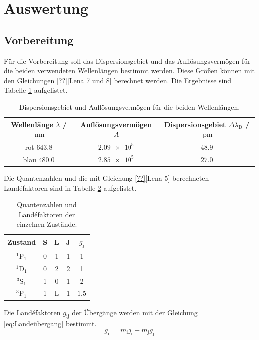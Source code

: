 \section{Auswertung}
\label{sec:Auswertung}
\subsection{Vorbereitung}
Für die Vorbereitung soll das Dispersionsgebiet und das Auflösungsvermögen für die beiden 
verwendeten Wellenlängen bestimmt werden. Diese Größen können mit den Gleichungen \eqref{??}[Lena 7 und 8] berechnet werden.
Die Ergebnisse sind Tabelle \ref{tab:Vorbereitung} aufgelistet.
\FloatBarrier
\begin{table}
    \centering
    \caption{Dispersionsgebiet und Auflösungsvermögen für die beiden Wellenlängen.}
    \label{tab:Vorbereitung}
    \begin{tabular}{c c c}
        \toprule
        Wellenlänge $\lambda$ / $\SI{}{\nano\meter}$&Auflösungsvermögen $A$& Dispersionsgebiet $\Delta \lambda_{\text{D}}$ / $\SI{}{\pico\meter}$\\
        \midrule
        rot $\num{643.8}$&$\num{2.09e5}$&$\num{48.9}$\\
        blau $\num{480.0}$&$\num{2.85e5}$&$\num{27.0}$\\
        \bottomrule
    \end{tabular}
\end{table}
\FloatBarrier
Die Quantenzahlen und die mit Gleichung \eqref{??}[Lena 5] berechneten Landéfaktoren sind in Tabelle \ref{tab:Quantenzahlen} 
aufgelistet.
\FloatBarrier
\begin{table}
    \centering
    \caption{Quantenzahlen und Landéfaktoren der einzelnen Zustände.}
    \label{tab:Quantenzahlen}
    \begin{tabular}{c c c c c}
        \toprule
        Zustand&S&L&J&$g_{\text{j}}$\\
        \midrule
        $^1\text{P}_1$&0&1&1&1\\
        $^1\text{D}_1$&0&2&2&1\\
        $^3\text{S}_1$&1&0&1&2\\
        $^3\text{P}_1$&1&L&1&$\num{1.5}$\\
        \bottomrule
    \end{tabular}
\end{table}
\FloatBarrier
Die Landéfaktoren $g_{\text{ij}}$ der Übergänge werden mit der Gleichung \eqref{eq:Landeübergang} bestimmt.
\begin{equation}
    \label{eq:Landeübergang}
    g_{\text{ij}} = m_{\text{i}}g_{\text{i}} - m_{\text{j}}g_{\text{j}}
\end{equation}
